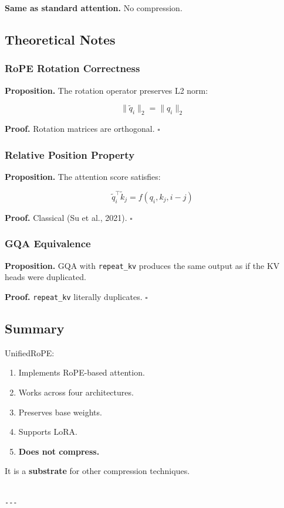 \textbf{Same as standard attention.} No compression.

\subsection{Theoretical Notes}

\subsubsection{RoPE Rotation Correctness}

\textbf{Proposition.} The rotation operator preserves L2 norm:

\[
\|\tilde{q}_i\|_2 = \|q_i\|_2
\tag{4.1}
\]

\textbf{Proof.} Rotation matrices are orthogonal. $\square$

\subsubsection{Relative Position Property}

\textbf{Proposition.} The attention score satisfies:

\[
\tilde{q}_i^\top \tilde{k}_j = f(q_i, k_j, i - j)
\tag{4.2}
\]

\textbf{Proof.} Classical (Su et al., 2021). $\square$

\subsubsection{GQA Equivalence}

\textbf{Proposition.} GQA with \texttt{repeat\_kv} produces the same output as if the 
KV heads were duplicated.

\textbf{Proof.} \texttt{repeat\_kv} literally duplicates. $\square$

\subsection{Summary}

UnifiedRoPE:
\begin{enumerate}
\item Implements RoPE-based attention.
\item Works across four architectures.
\item Preserves base weights.
\item Supports LoRA.
\item \textbf{Does not compress.}

\end{enumerate}
It is a \textbf{substrate} for other compression techniques.
\begin{lstlisting}

---
\end{lstlisting}